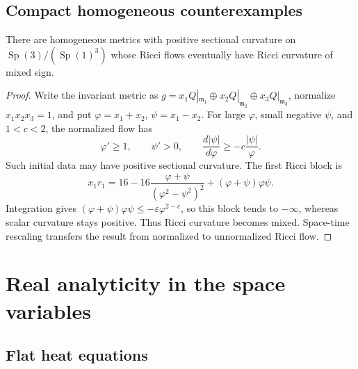\subsection{Compact homogeneous counterexamples}

\begin{theorem}
\label{thm:chow-ii-bohm-wilking-ricci-sign-counterexample}
There are homogeneous metrics with positive sectional curvature on
\(\operatorname{Sp}(3)/(\operatorname{Sp}(1)^3)\) whose Ricci flows
eventually have Ricci curvature of mixed sign.
\end{theorem}
\begin{proof}
Write the invariant metric as \(g=x_1Q|_{\mathfrak m_1}\oplus
x_2Q|_{\mathfrak m_2}\oplus x_3Q|_{\mathfrak m_3}\), normalize
\(x_1x_2x_3=1\), and put \(\varphi=x_1+x_2\), \(\psi=x_1-x_2\).  For large
\(\varphi\), small negative \(\psi\), and \(1<c<2\), the normalized flow has
\[
 \varphi'\geq1,\qquad\psi'>0,\qquad
 \frac{d|\psi|}{d\varphi}\geq-c\frac{|\psi|}{\varphi}.
\]
Such initial data may have positive sectional curvature.  The first Ricci
block is
\[
 x_1r_1=16-16\frac{\varphi+\psi}{(\varphi^2-\psi^2)^2}
 +(\varphi+\psi)\varphi\psi.
\]
Integration gives
\((\varphi+\psi)\varphi\psi\leq-\varepsilon\varphi^{2-c}\), so this block
tends to \(-\infty\), whereas scalar curvature stays positive.  Thus Ricci
curvature becomes mixed.  Space-time rescaling transfers the result from
normalized to unnormalized Ricci flow.
\end{proof}

\section{Real analyticity in the space variables}

\subsection{Flat heat equations}

